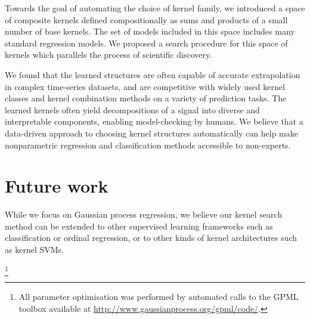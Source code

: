 

Towards the goal of automating the choice of kernel family, we introduced a space of composite kernels defined compositionally as sums and products of a small number of base kernels.  
The set of models included in this space includes many standard regression models.
We proposed a search procedure for this space of kernels which parallels the process of scientific discovery.

We found that the learned structures are often capable of accurate extrapolation in complex time-series datasets, and are competitive with widely used kernel classes and kernel combination methods on a variety of prediction tasks.
The learned kernels often yield decompositions of a signal into diverse and interpretable components, enabling model-checking by humans.  %
We believe that a data-driven approach to choosing kernel structures automatically can help make nonparametric regression and classification methods accessible to non-experts.


\section{Future work}

While we focus on Gaussian process regression, we believe our kernel search method can be extended to other supervised learning frameworks such as classification or ordinal regression, or to other kinds of kernel architectures such as kernel SVMs.


\footnote{
All \gp{} parameter optimisation was performed by automated calls to the GPML toolbox available at \url{http://www.gaussianprocess.org/gpml/code/}.}




